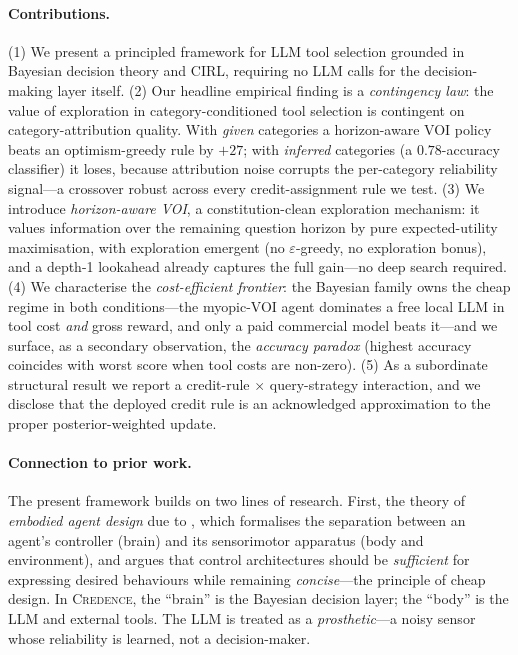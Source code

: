 \documentclass[11pt]{article}
\newcommand{\credence}{\textsc{Credence}}
\begin{document}
\paragraph{Contributions.} (1) We present a principled framework for LLM tool selection grounded in Bayesian decision theory and CIRL, requiring no LLM calls for the decision-making layer itself. (2) Our headline empirical finding is a \emph{contingency law}: the value of exploration in category-conditioned tool selection is contingent on category-attribution quality. With \emph{given} categories a horizon-aware VOI policy beats an optimism-greedy rule by $+27$; with \emph{inferred} categories (a $0.78$-accuracy classifier) it loses, because attribution noise corrupts the per-category reliability signal---a crossover robust across every credit-assignment rule we test. (3) We introduce \emph{horizon-aware VOI}, a constitution-clean exploration mechanism: it values information over the remaining question horizon by pure expected-utility maximisation, with exploration emergent (no $\varepsilon$-greedy, no exploration bonus), and a depth-1 lookahead already captures the full gain---no deep search required. (4) We characterise the \emph{cost-efficient frontier}: the Bayesian family owns the cheap regime in both conditions---the myopic-VOI agent dominates a free local LLM in tool cost \emph{and} gross reward, and only a paid commercial model beats it---and we surface, as a secondary observation, the \emph{accuracy paradox} (highest accuracy coincides with worst score when tool costs are non-zero). (5) As a subordinate structural result we report a credit-rule $\times$ query-strategy interaction, and we disclose that the deployed credit rule is an acknowledged approximation to the proper posterior-weighted update.

\paragraph{Connection to prior work.} The present framework builds on two lines of research. First, the theory of \emph{embodied agent design} due to \citet{ay2015geometric}, which formalises the separation between an agent's controller (brain) and its sensorimotor apparatus (body and environment), and argues that control architectures should be \emph{sufficient} for expressing desired behaviours while remaining \emph{concise}---the principle of cheap design. In \credence{}, the ``brain'' is the Bayesian decision layer; the ``body'' is the LLM and external tools. The LLM is treated as a \emph{prosthetic}---a noisy sensor whose reliability is learned, not a decision-maker.
\end{document}
